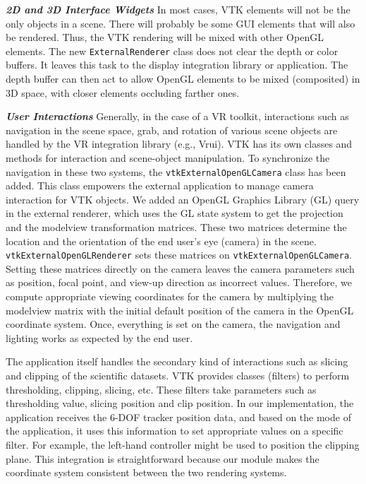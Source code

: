 \textbf{\textit{2D and 3D Interface Widgets}} In most cases, VTK elements will not be the only objects in a scene.
There will probably be some GUI elements that will also be rendered.
Thus, the VTK rendering will be mixed with other OpenGL elements.
The new \texttt{ExternalRenderer} class does not clear the depth or color buffers. It leaves this task to the display integration library or application.
The depth buffer can then act to allow OpenGL elements to be mixed (composited)
in 3D space, with closer elements occluding farther ones.

\textbf{\textit{User Interactions}} Generally, in the case of a VR toolkit, interactions such as navigation in the scene space, grab, and rotation of various scene objects are handled by the VR integration library (e.g., Vrui).
VTK has its own classes and methods for interaction and scene-object manipulation.
To synchronize the navigation in these two systems, the \texttt{vtkExternalOpenGLCamera} class has been added.
This class empowers the external application to manage camera interaction for VTK objects.
We added an OpenGL Graphics Library (GL) query in the external renderer, which uses the GL state system to get the projection and the modelview transformation matrices.
These two matrices determine the location and the orientation of the end user's eye
(camera) in the scene.
\texttt{vtkExternalOpenGLRenderer} sets these matrices on \texttt{vtkExternalOpenGLCamera}.
Setting these matrices directly on the camera leaves the camera parameters such as position, focal point, and view-up direction as incorrect values. Therefore, we compute appropriate viewing coordinates for the camera by multiplying the modelview matrix with the initial default position of the camera in the OpenGL coordinate system. 
Once, everything is set on the camera, the navigation and lighting works as expected by the end user.

The application itself handles the secondary kind of interactions such as slicing and clipping of the scientific datasets.
VTK provides classes (filters) to perform thresholding, clipping, slicing, etc.
These filters take parameters such as thresholding value, slicing position and clip position. 
In our implementation, the application receives the 6-DOF tracker position data, and based on the mode of the application, it uses this information to set appropriate values on a specific filter.
For example, the left-hand controller might be used to position the clipping plane.
This integration is straightforward because our module makes the coordinate system consistent between the two rendering systems.

